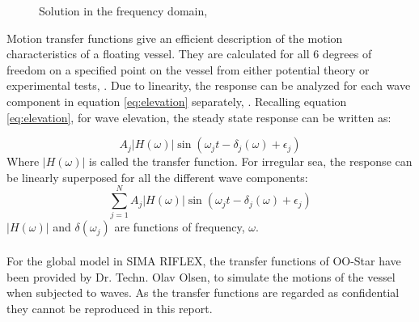 \begin{figure}[H]
\hfill
{}\hfill
  \hfill
\caption[$\; \:$Solution in the frequency domain]{Solution in the frequency domain, \cite{Langen1999}}
\label{fig:transex}
\end{figure}

\noindent Motion transfer functions give an efficient description of the motion characteristics of a floating vessel. They are calculated for all 6 degrees of freedom on a specified point on the vessel from either potential theory or experimental tests, \cite{sintef2017}. Due to linearity, the response can be analyzed for each wave component in equation \ref{eq:elevation} separately, \cite{Faltinsen1990}. Recalling equation \ref{eq:elevation}, for wave elevation, the steady state response can be written as:

\begin{equation}
    A_j |H(\omega)|\sin(\omega_jt-\delta_j(\omega)+\epsilon_j)
\end{equation}
Where $|H(\omega)|$ is called the transfer function. For irregular sea, the response can be linearly superposed for all the different wave components:
\begin{equation}
    \sum_{j=1}^N  A_j |H(\omega)|\sin(\omega_jt-\delta_j(\omega)+\epsilon_j)
\end{equation}
 $|H(\omega)|$ and $\delta(\omega_j)$ are functions of frequency, $\omega$.\\\\
\noindent For the global model in SIMA RIFLEX, the transfer functions of OO-Star have been provided by Dr. Techn. Olav Olsen, to simulate the motions of the vessel when subjected to waves. As the transfer functions are regarded as confidential they cannot be reproduced in this report.   

